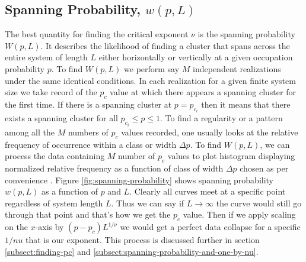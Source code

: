 	\subsection{Spanning Probability, $w(p,L)$}
	\label{subsect:spanning-probability}
	The best quantity for finding the critical exponent $\nu$	is the spanning probability $W(p,L)$. It describes the likelihood of finding a cluster that spans across the entire system of length $L$ either horizontally or vertically at a given occupation probability $p$. To find $W(p,L)$ we perform say $M$ independent realizations under the same identical conditions. In each realization for a given finite system size	we take record of the $p_c$ value at which there appears a	spanning cluster for the first time. If there is a spanning	cluster at $p=p_{c_i}$ then it means that there exists a spanning cluster for all $p_{c_i} \leq p \leq 1$. To find a regularity or a	pattern among all the $M$ numbers of $p_c$ values recorded,	one usually looks at the relative frequency of occurrence	within a class or width $\Delta p$. To find $W(p,L)$, we can process the data containing $M$ number of $p_c$ values to plot	histogram displaying normalized relative frequency as a	function of class of width $\Delta p$ chosen as per convenience	\cite{redefinition-of-site-percolation}. Figure \ref{fig:spanning-probability} shows spanning probability $w(p,L)$ as a function of $p$ and $L$. Clearly all curves meet at a specific point regardless of system length $L$. Thus we can say if $L \rightarrow \infty$ the curve would still go through that point and that's how we get the $p_c$ value. Then if we apply scaling on the $x$-axis by $(p-p_c)L^{1/\nu}$ we would get a perfect data collapse for a specific $1/nu$ that is our exponent. This process is discussed further in section \ref{subsect:finding-pc} and \ref{subsect:spanning-probability-and-one-by-nu}.



